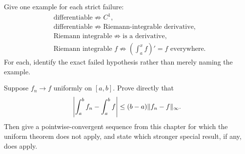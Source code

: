 \begin{exercise}
Give one example for each strict failure:
\[
\begin{aligned}
&\text{differentiable}\not\Longrightarrow C^1,\\
&\text{differentiable}\not\Longrightarrow
  \text{Riemann-integrable derivative},\\
&\text{Riemann integrable}\not\Longrightarrow\text{is a derivative},\\
&\text{Riemann integrable }f\not\Longrightarrow
  \left(\int_a^x f\right)'=f\text{ everywhere}.
\end{aligned}
\]
For each, identify the exact failed hypothesis rather than merely naming the
example.
\end{exercise}

\begin{exercise}
Suppose \(f_n\to f\) uniformly on \([a,b]\). Prove directly that
\[
\left|\int_a^b f_n-\int_a^b f\right|
\leq(b-a)\lVert f_n-f\rVert_\infty.
\]
Then give a pointwise-convergent sequence from this chapter for which the
uniform theorem does not apply, and state which stronger special result, if
any, does apply.
\end{exercise}
